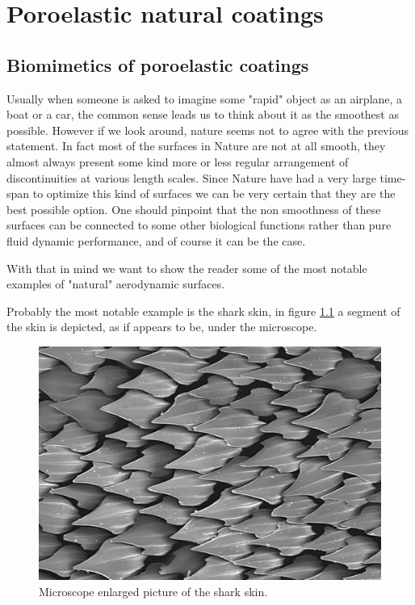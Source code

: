 \chapter{Poroelastic natural coatings}


\section{Biomimetics of poroelastic coatings}

Usually when someone is asked to imagine some "rapid" object as an airplane, a boat or a car, the common sense leads us to think about it as the smoothest as possible.
However if we look around, nature seems not to agree with the previous statement.
In fact most of the surfaces in Nature are not at all smooth, they almost always present some kind more or less regular arrangement of discontinuities at various length scales.
Since Nature have had a very large time-span to optimize this kind of surfaces we can be very certain that they are the best possible option.
One should pinpoint that the non smoothness of these surfaces can be connected to some other biological functions rather than pure fluid dynamic performance, and of course it can be the case.

With that in mind we want to show the reader some of the most notable examples of "natural" aerodynamic surfaces.

Probably the most notable example is the shark skin, in figure \ref{fig:shark} a segment of the skin is depicted, as if appears to be, under the microscope.

\begin{figure}[h]
	\centering
	\includegraphics[width=0.6\linewidth]{chapter_1/shark}
	\caption{Microscope enlarged picture of the shark skin.}
	\label{fig:shark}
\end{figure}

